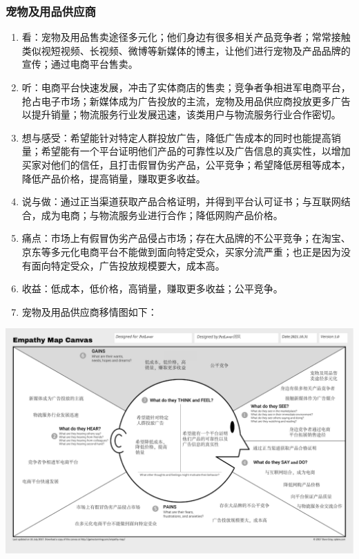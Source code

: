 \documentclass[a4paper]{ctexart}
\begin{document}
\subsubsection{宠物及用品供应商}
\begin{enumerate}[label=\alph*.]
  \item 看：宠物及用品售卖途径多元化；他们身边有很多相关产品竞争者；常常接触类似视短视频、长视频、微博等新媒体的博主，让他们进行宠物及产品品牌的宣传；通过电商平台售卖。
  \item 听：电商平台快速发展，冲击了实体商店的售卖；竞争者争相进军电商平台，抢占电子市场；新媒体成为广告投放的主流，宠物及用品供应商投放更多广告以提升销量；物流服务行业发展迅速，该类用户与物流服务行业合作密切。
  \item 想与感受：希望能针对特定人群投放广告，降低广告成本的同时也能提高销量；希望能有一个平台证明他们产品的可靠性以及广告信息的真实性，以增加买家对他们的信任，且打击假冒伪劣产品，公平竞争；希望降低房租等成本，降低产品价格，提高销量，赚取更多收益。
  \item 说与做：通过正当渠道获取产品合格证明，并得到平台认可证书；与互联网结合，成为电商；与物流服务业进行合作；降低网购产品价格。
  \item 痛点：市场上有假冒伪劣产品侵占市场；存在大品牌的不公平竞争；在淘宝、京东等多元化电商平台不能做到面向特定受众，买家分流严重；也正是因为没有面向特定受众，广告投放规模要大，成本高。
  \item 收益：低成本，低价格，高销量，赚取更多收益；公平竞争。
  \item 宠物及用品供应商移情图如下：
\end{enumerate}
\begin{center}
  \includegraphics[width=16cm]{./移情图/宠物及用品供应商}
\end{center}
\end{document}

